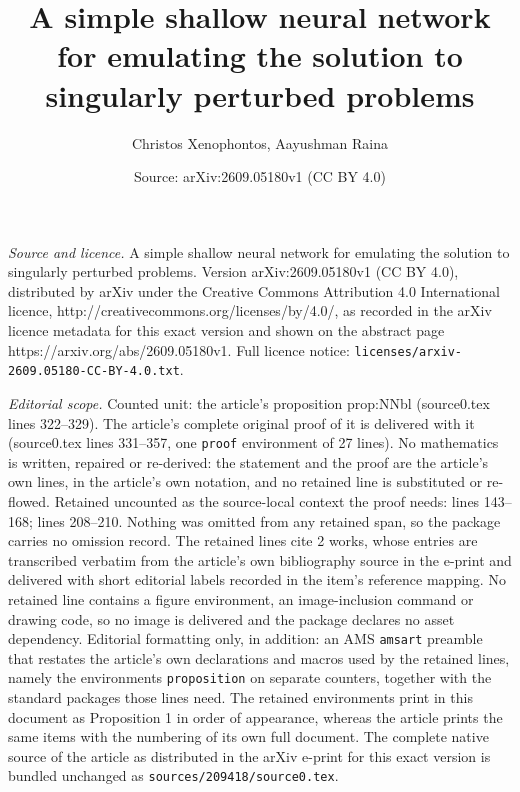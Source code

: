 \documentclass[10pt,a4paper]{amsart}
\title{A simple shallow neural network for emulating the solution to singularly perturbed problems}
\author{Christos Xenophontos, Aayushman Raina}
\date{Source: arXiv:2609.05180v1 (CC BY 4.0)}
\begin{document}
\maketitle

\noindent\emph{Source and licence.} A simple shallow neural network for emulating the solution to singularly perturbed problems. Version arXiv:2609.05180v1 (CC BY 4.0), distributed by arXiv under the Creative Commons Attribution 4.0 International licence, http://creativecommons.org/licenses/by/4.0/, as recorded in the arXiv licence metadata for this exact version and shown on the abstract page https://arxiv.org/abs/2609.05180v1. Full licence notice: \texttt{licenses/arxiv-2609.05180-CC-BY-4.0.txt}.\par\smallskip

\noindent\textit{Editorial scope.} Counted unit: the article's proposition prop:NNbl (source0.tex lines 322--329). The article's complete original proof of it is delivered with it (source0.tex lines 331--357, one \texttt{proof} environment of 27 lines). No mathematics is written, repaired or re-derived: the statement and the proof are the article's own lines, in the article's own notation, and no retained line is substituted or re-flowed.  Retained uncounted as the source-local context the proof needs: lines 143--168; lines 208--210.  Nothing was omitted from any retained span, so the package carries no omission record.  The retained lines cite 2 works, whose entries are transcribed verbatim from the article's own bibliography source in the e-print and delivered with short editorial labels recorded in the item's reference mapping.  No retained line contains a figure environment, an image-inclusion command or drawing code, so no image is delivered and the package declares no asset dependency.  Editorial formatting only, in addition: an AMS \texttt{amsart} preamble that restates the article's own declarations and macros used by the retained lines, namely the environments \texttt{proposition} on separate counters, together with the standard packages those lines need.  The retained environments print in this document as Proposition 1 in order of appearance, whereas the article prints the same items with the numbering of its own full document.  The complete native source of the article as distributed in the arXiv e-print for this exact version is bundled unchanged as \texttt{sources/209418/source0.tex}.
\end{document}
